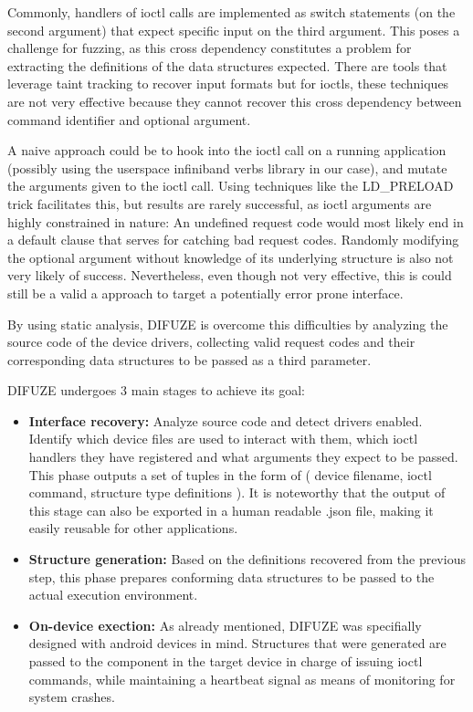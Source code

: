 Commonly, handlers of ioctl calls are implemented as switch statements (on the second argument) that expect specific
input on the third argument. This poses a challenge for fuzzing, as this cross dependency constitutes a problem for extracting
the definitions of the data structures expected. There are tools that leverage taint tracking to recover input formats\cite{buzzfuzz}\cite{dowser}
but for ioctls, these techniques are not very effective\cite{difuze17} because they cannot recover this cross dependency between command identifier
and optional argument.

A naive approach could be to hook into the ioctl call on a running application (possibly using the userspace infiniband verbs library
in our case), and mutate the arguments given to the ioctl call. Using techniques like the LD\_PRELOAD trick facilitates this,
but results are rarely successful, as ioctl arguments are highly constrained in nature: An undefined request code
would most likely end in a default clause that serves for catching bad request codes. Randomly modifying the optional argument
without knowledge of its underlying structure is also not very likely of success.
Nevertheless, even though not very effective, this is could still be a valid a approach to target a potentially error prone interface.

By using static analysis, DIFUZE is overcome this difficulties by analyzing the source code of the device drivers,
collecting valid request codes and their corresponding data structures to be passed as a third parameter.

DIFUZE undergoes 3 main stages to achieve its goal:

\begin{itemize}
  \item \textbf{Interface recovery:} Analyze source code and detect drivers enabled. Identify which device files are used to interact with them, which ioctl handlers they have registered and what arguments they expect to be passed. This phase outputs a set of tuples in the form of ( device filename, ioctl command, structure type definitions ). It is noteworthy that the output of this stage can also be exported in a human readable .json file, making it easily reusable for other applications.
  \item \textbf{Structure generation:} Based on the definitions recovered from the previous step, this phase prepares conforming data structures to be passed to the actual execution environment.
  \item \textbf{On-device exection:} As already mentioned, DIFUZE was specifially designed with android devices in mind. Structures that were generated are passed to the component in the target device in charge of issuing ioctl commands, while maintaining a heartbeat signal as means of monitoring for system crashes.
\end{itemize}

